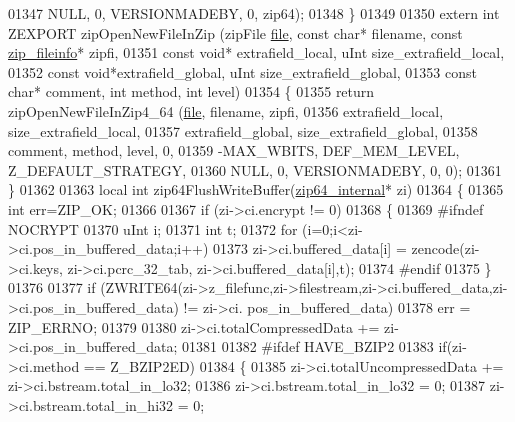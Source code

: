 \begin{DoxyCode}
01347                                  NULL, 0, VERSIONMADEBY, 0, zip64);
01348 \}
01349 
01350 \textcolor{keyword}{extern} \textcolor{keywordtype}{int} ZEXPORT zipOpenNewFileInZip (zipFile \hyperlink{structfile}{file}, \textcolor{keyword}{const} \textcolor{keywordtype}{char}* filename, \textcolor{keyword}{const} 
      \hyperlink{structzip__fileinfo}{zip\_fileinfo}* zipfi,
01351                                         \textcolor{keyword}{const} \textcolor{keywordtype}{void}* extrafield\_local, uInt size\_extrafield\_local,
01352                                         \textcolor{keyword}{const} \textcolor{keywordtype}{void}*extrafield\_global, uInt size\_extrafield\_global,
01353                                         \textcolor{keyword}{const} \textcolor{keywordtype}{char}* comment, \textcolor{keywordtype}{int} method, \textcolor{keywordtype}{int} level)
01354 \{
01355     \textcolor{keywordflow}{return} zipOpenNewFileInZip4\_64 (\hyperlink{structfile}{file}, filename, zipfi,
01356                                  extrafield\_local, size\_extrafield\_local,
01357                                  extrafield\_global, size\_extrafield\_global,
01358                                  comment, method, level, 0,
01359                                  -MAX\_WBITS, DEF\_MEM\_LEVEL, Z\_DEFAULT\_STRATEGY,
01360                                  NULL, 0, VERSIONMADEBY, 0, 0);
01361 \}
01362 
01363 local \textcolor{keywordtype}{int} zip64FlushWriteBuffer(\hyperlink{structzip64__internal}{zip64\_internal}* zi)
01364 \{
01365     \textcolor{keywordtype}{int} err=ZIP\_OK;
01366 
01367     \textcolor{keywordflow}{if} (zi->ci.encrypt != 0)
01368     \{
01369 \textcolor{preprocessor}{#ifndef NOCRYPT}
01370         uInt i;
01371         \textcolor{keywordtype}{int} t;
01372         \textcolor{keywordflow}{for} (i=0;i<zi->ci.pos\_in\_buffered\_data;i++)
01373             zi->ci.buffered\_data[i] = zencode(zi->ci.keys, zi->ci.pcrc\_32\_tab, zi->ci.buffered\_data[i],t);
01374 \textcolor{preprocessor}{#endif}
01375     \}
01376 
01377     \textcolor{keywordflow}{if} (ZWRITE64(zi->z\_filefunc,zi->filestream,zi->ci.buffered\_data,zi->ci.pos\_in\_buffered\_data) != zi->ci.
      pos\_in\_buffered\_data)
01378       err = ZIP\_ERRNO;
01379 
01380     zi->ci.totalCompressedData += zi->ci.pos\_in\_buffered\_data;
01381 
01382 \textcolor{preprocessor}{#ifdef HAVE\_BZIP2}
01383     \textcolor{keywordflow}{if}(zi->ci.method == Z\_BZIP2ED)
01384     \{
01385       zi->ci.totalUncompressedData += zi->ci.bstream.total\_in\_lo32;
01386       zi->ci.bstream.total\_in\_lo32 = 0;
01387       zi->ci.bstream.total\_in\_hi32 = 0;

\end{DoxyCode}
